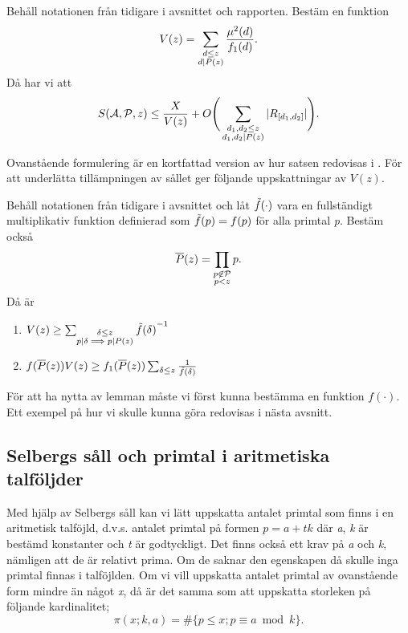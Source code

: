 \begin{theorem}\label{sel.sieve.thm}
Behåll notationen från tidigare i avsnittet och rapporten. 
Bestäm en funktion
\begin{equation}
    V(z) = \sum_{\substack{d\leq z\\ d\divides P(z)}}\frac{\mu^2(d)}{f_1(d)}.\nonumber
\end{equation}
Då har vi att
\begin{equation}
    \S{A}{P}{z} \leq \frac{X}{V(z)} + O\Bigg(\sum_{\substack{d_1,d_2\leq z\\d_1,d_2\divides P(z)}}|R_{[d_1, d_2]}|\Bigg).\nonumber
\end{equation}
\end{theorem}
Ovanstående formulering är en kortfattad version av hur satsen redovisas i \cite{cojocarumurty}. 
För att underlätta tillämpningen av sållet ger \cite{cojocarumurty} följande uppskattningar av \(V(z)\).
\begin{lemma}[Uppskattningar av \(V(z)\)]\label{thm:SelVApp}
Behåll notationen från tidigare i avsnittet och låt \(\Tilde{f}(\cdot)\) vara en fullständigt multiplikativ funktion definierad som \(\Tilde{f}(p) = f(p)\) för alla primtal \textit{p}. Bestäm också
\begin{equation}
    \overline{P}(z) = \prod_{\substack{p\not\in\P\\p<z}} p.\nonumber
\end{equation}
Då är
\begin{enumerate}
    \item \(
         V(z) \geq \sum_{\substack{\delta\leq z\\p\divides\delta\implies p\divides P(z)}} {\Tilde{f}(\delta)}^{-1}\nonumber\)
    \item \(
        f(\overline{P}(z))V(z) \geq f_1(\overline{P}(z))\sum_{\delta \leq z}\frac{1}{\Tilde{f}(\delta)}\nonumber
    \)
\end{enumerate}
\end{lemma}
För att ha nytta av lemman måste vi först kunna bestämma en funktion \(f(\cdot)\). 
Ett exempel på hur vi skulle kunna göra redovisas i nästa avsnitt.

\subsection{Selbergs såll och primtal i aritmetiska talföljder}

Med hjälp av Selbergs såll kan vi lätt uppskatta antalet primtal som finns i en aritmetisk talföjld, d.v.s. antalet primtal på formen \(p = a + tk\) där \textit{a}, \textit{k} är bestämd konstanter och \textit{t} är godtyckligt. 
Det finns också ett krav på \textit{a} och \textit{k}, nämligen att de är relativt prima. Om de saknar den egenskapen då skulle inga primtal finnas i talföjlden. 
Om vi vill uppskatta antalet primtal av ovanstående form mindre än något \textit{x}, då är det samma som att uppskatta storleken på följande kardinalitet;
\begin{equation}
    \pi(x;k,a) = \#\{p\leq x; p \equiv a \bmod{k}\}.\label{sel.apl.arithPrimes}
\end{equation}

